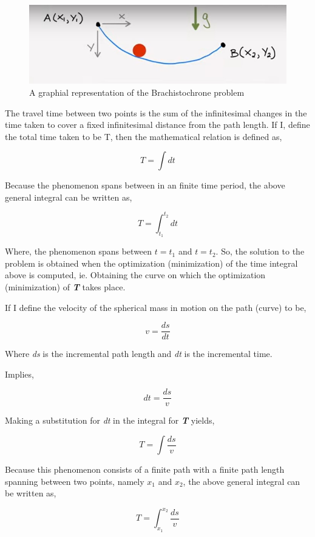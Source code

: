 

\begin{figure}[H]
\centering
\includegraphics[width=13cm]{BrachPoints.jpg}
    		\caption{{A graphial representation of the Brachistochrone problem}}
\end{figure}



{The travel time between two points is the sum of the infinitesimal changes in the time taken to cover a fixed infinitesimal distance from the path length. If I, define the total time taken to be T, then the mathematical relation is defined as,}

	$$T = \int dt$$

{Because the phenomenon spans between in an finite time period, the above general integral can be written as,}

	$$T = \int_{t_{1}}^{t_{2}} dt$$

{Where, the phenomenon spans between $t = t_{1}$ and $t = t_{2}$. So, the solution to the problem is obtained when the optimization (minimization) of the time integral above is computed, ie. Obtaining the curve on which the optimization (minimization) of \textit{\textbf{T}} takes place.}

{If I define the velocity of the spherical mass in motion on the path (curve) to be,}

	$$v = \frac{ds}{dt}$$

{Where \textit{ds} is the incremental path length and \textit{dt} is the incremental time.}

{Implies,}

	$$dt = \frac{ds}{v}$$

{Making a substitution for \textit{dt} in the integral for \textit{\textbf{T}} yields,}

	$$T = \int \frac{ds}{v}$$

{Because this phenomenon consists of a finite path with a finite path length spanning between two points, namely $x_{1}$ and $x_{2}$, the above general integral can be written as,}

	\begin{equation}
		T = \int_{x_{1}}^{x_{2}} \frac{ds}{v}
		\label{T-ab}
	\end{equation}

